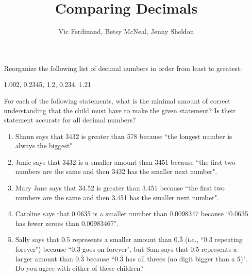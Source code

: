 \documentclass{ximera}
\title{Comparing Decimals}
\author{Vic Ferdinand, Betsy McNeal, Jenny Sheldon}
\begin{document}
\begin{abstract}\end{abstract}
\maketitle



\begin{problem}
 Reorganize the following list of decimal numbers in order from least to greatest:\\

\begin{center}
    1.002, 0.2345, 1.2,  0.234, 1.21
\end{center}

\end{problem}


\begin{problem}
For each of the following statements, what is the minimal amount of correct understanding that the child must have to make the given statement?  Is their statement accurate for all decimal numbers?
\begin{enumerate}
    

\item Shaun says that 3432 is greater than 578 because ``the longest number is always the biggest".

\vfill




\item Janie says that 3432 is a smaller amount than 3451 because ``the first two numbers are the same and then 3432 has the smaller next number".
\vfill

\item Mary Jane says that 34.52  is greater than 3.451 because ``the first two numbers are the same and then 3.451 has the smaller next number".
\vfill

\item Caroline says that 0.0635  is a smaller number than  0.0098347 because ``0.0635 has fewer zeroes than 0.00983467".
\vfill

\item Sally says that 0.5  represents a smaller amount than 0.$\overline{3}$  (i.e., ``0.3 repeating forever") because ``0.$\overline{3}$ goes on forever", but Sam says that 0.5 represents a larger amount than 0.$\overline{3}$ because ``0.$\overline{3}$ has all threes (no digit bigger than a 5)".  Do you agree with either of these children?
\vfill

\end{enumerate}

\end{problem}
\end{document}
